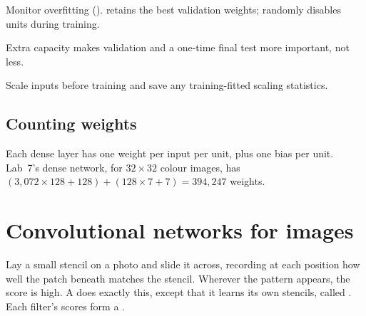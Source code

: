 Monitor overfitting ().  retains the best validation weights;  randomly disables units during training.

\begin{keyidea}
Extra capacity makes validation and a one-time final test more important, not less.
\end{keyidea}

\begin{pitfall}
Scale inputs before training and save any training-fitted scaling statistics.
\end{pitfall}

\subsection{Counting weights}

Each dense layer has one weight per input per unit, plus one bias per unit. Lab~7's dense network, for $32\times32$ colour images, has $(3{,}072\times128+128)+(128\times7+7)=394{,}247$ weights.


\section{Convolutional networks for images}

\begin{analogy}
Lay a small stencil on a photo and slide it across, recording at each position how well the patch beneath matches the stencil. Wherever the pattern appears, the score is high. A  does exactly this, except that it learns its own stencils, called . Each filter's scores form a .
\end{analogy}

